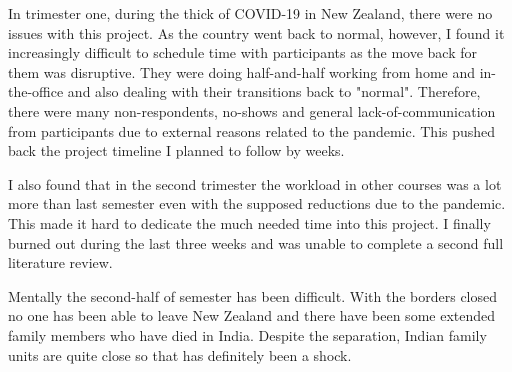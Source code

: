  \par In trimester one, during the thick of COVID-19 in New Zealand, there were no issues with this project. As the country went back to normal, however, I found it increasingly difficult to schedule time with participants as the move back for them was disruptive. They were doing half-and-half working from home and in-the-office and also dealing with their transitions back to "normal". Therefore, there were many non-respondents, no-shows and general lack-of-communication from participants due to external reasons related to the pandemic. This pushed back the project timeline I planned to follow by weeks. 
 \newline
\par I also found that in the second trimester the workload in other courses was a lot more than last semester even with the supposed reductions due to the pandemic. This made it hard to dedicate the much needed time into this project. I finally burned out during the last three weeks and was unable to complete a second full literature review. 
\newline
\par Mentally the second-half of semester has been difficult. With the borders closed no one has been able to leave New Zealand and there have been some extended family members who have died in India. Despite the separation, Indian family units are quite close so that has definitely been a shock. 

